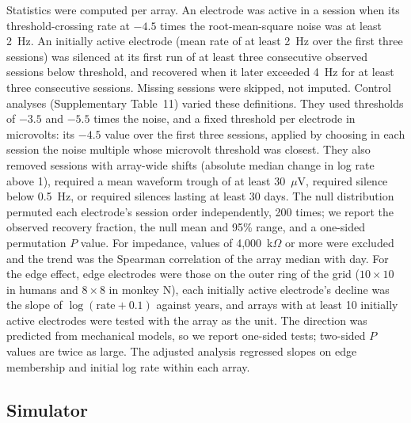 \documentclass[pdflatex,sn-nature]{sn-jnl}
\begin{document}
Statistics were computed per array. An electrode was active in a session when its threshold-crossing rate at $-4.5$ times
the root-mean-square noise was at least 2~Hz. An initially active electrode (mean rate of at least 2~Hz over the first
three sessions) was silenced at its first run of at least three consecutive observed sessions below threshold, and
recovered when it later exceeded 4~Hz for at least three consecutive sessions. Missing sessions were skipped, not
imputed. Control analyses (Supplementary Table~11) varied these definitions. They used thresholds of $-3.5$ and $-5.5$ times
the noise, and a fixed threshold per electrode in microvolts: its $-4.5$ value over the first three sessions, applied by
choosing in each session the noise multiple whose microvolt threshold was closest. They also removed sessions with
array-wide shifts (absolute median change in log rate above 1), required a mean waveform trough of at least 30~$\mu$V,
required silence below 0.5~Hz, or required silences lasting at least 30 days. The null distribution permuted each electrode's session order
independently, 200 times; we report the observed recovery fraction, the null mean and 95\% range, and a one-sided
permutation $P$ value. For impedance, values of 4,000~k$\Omega$ or more were excluded and the trend was the Spearman
correlation of the array median with day. For the edge effect, edge electrodes were those on the outer ring of the grid
($10\times10$ in humans and $8\times8$ in monkey N), each initially active electrode's decline was the slope of
$\log(\text{rate} + 0.1)$ against years, and arrays with at least 10 initially active electrodes were tested with the
array as the unit. The direction was predicted from mechanical models\cite{forrest2025}, so we report one-sided tests;
two-sided $P$ values are twice as large. The adjusted analysis regressed slopes on edge membership and initial log rate
within each array.

\subsection*{Simulator}
\end{document}
